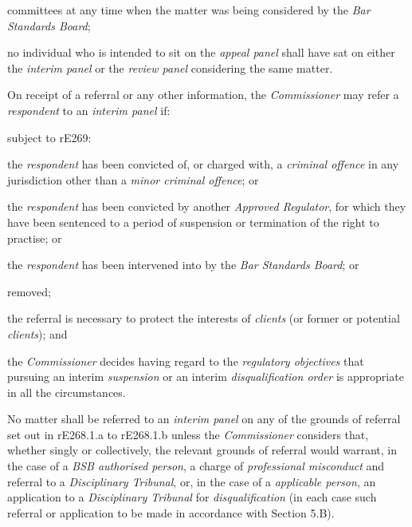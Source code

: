 committees at any time when the matter was being considered by
the \emph{Bar Standards Board};\lr\la\item no individual who is intended to sit on the \emph{appeal panel} shall
have sat on either the \emph{interim panel} or the \emph{review
panel} considering the same matter.\ln
{}\par
{}
On receipt of a referral\emph{ }or any other information,
the \emph{Commissioner} may refer a \emph{respondent} to
an \emph{interim panel} if:\\\nl \item subject to rE269:\al
\item the \emph{respondent }has been convicted of, or charged with,
a \emph{criminal offence} in any jurisdiction other than a \emph{minor
criminal offence}; or\\
\item the \emph{respondent} has been convicted by another \emph{Approved
Regulator}, for which they have been sentenced to a period of suspension
or termination of the right to practise; or\\
\item the \emph{respondent} has been intervened into by the \emph{Bar
Standards Board}; or\\
\item  removed;\\
\item the referral is necessary to protect the interests
of \emph{clients} (or former or potential \emph{clients}); and\la\item the \emph{Commissioner} decides having regard to the \emph{regulatory
objectives} that pursuing an interim \emph{suspension} or an
interim \emph{disqualification order} is appropriate in all the
circumstances.\ln
{}\par
No matter shall be referred to an \emph{interim panel}  on any of the
grounds of referral set out in rE268.1.a to rE268.1.b unless
the \emph{Commissioner} considers that, whether singly or collectively,
 the relevant grounds of referral would warrant, in the case of
a \emph{BSB authorised person}, a charge of \emph{professional
misconduct} and referral to a \emph{Disciplinary Tribunal}, or, in the
case of a \emph{applicable person}, an application to
a \emph{Disciplinary Tribunal} for \emph{disqualification} (in each case
such referral or application to be made in accordance with Section
5.B).\\
